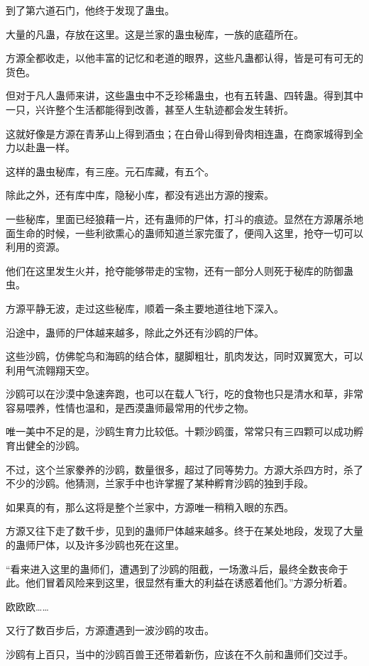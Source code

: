 \begin{this_body}
到了第六道石门，他终于发现了蛊虫。

大量的凡蛊，存放在这里。这是兰家的蛊虫秘库，一族的底蕴所在。

方源全都收走，以他丰富的记忆和老道的眼界，这些凡蛊都认得，皆是可有可无的货色。

但对于凡人蛊师来讲，这些蛊虫中不乏珍稀蛊虫，也有五转蛊、四转蛊。得到其中一只，兴许整个生活都能得到改善，甚至人生轨迹都会发生转折。

这就好像是方源在青茅山上得到酒虫；在白骨山得到骨肉相连蛊，在商家城得到全力以赴蛊一样。

这样的蛊虫秘库，有三座。元石库藏，有五个。

除此之外，还有库中库，隐秘小库，都没有逃出方源的搜索。

一些秘库，里面已经狼藉一片，还有蛊师的尸体，打斗的痕迹。显然在方源屠杀地面生命的时候，一些利欲熏心的蛊师知道兰家完蛋了，便闯入这里，抢夺一切可以利用的资源。

他们在这里发生火并，抢夺能够带走的宝物，还有一部分人则死于秘库的防御蛊虫。

方源平静无波，走过这些秘库，顺着一条主要地道往地下深入。

沿途中，蛊师的尸体越来越多，除此之外还有沙鸥的尸体。

这些沙鸥，仿佛鸵鸟和海鸥的结合体，腿脚粗壮，肌肉发达，同时双翼宽大，可以利用气流翱翔天空。

沙鸥可以在沙漠中急速奔跑，也可以在载人飞行，吃的食物也只是清水和草，非常容易喂养，性情也温和，是西漠蛊师最常用的代步之物。

唯一美中不足的是，沙鸥生育力比较低。十颗沙鸥蛋，常常只有三四颗可以成功孵育出健全的沙鸥。

不过，这个兰家豢养的沙鸥，数量很多，超过了同等势力。方源大杀四方时，杀了不少的沙鸥。他猜测，兰家手中也许掌握了某种孵育沙鸥的独到手段。

如果真的有，那么这将是整个兰家中，方源唯一稍稍入眼的东西。

方源又往下走了数千步，见到的蛊师尸体越来越多。终于在某处地段，发现了大量的蛊师尸体，以及许多沙鸥也死在这里。

“看来进入这里的蛊师们，遭遇到了沙鸥的阻截，一场激斗后，最终全数丧命于此。他们冒着风险来到这里，很显然有重大的利益在诱惑着他们。”方源分析着。

欧欧欧……

又行了数百步后，方源遭遇到一波沙鸥的攻击。

沙鸥有上百只，当中的沙鸥百兽王还带着新伤，应该在不久前和蛊师们交过手。


\end{this_body}
